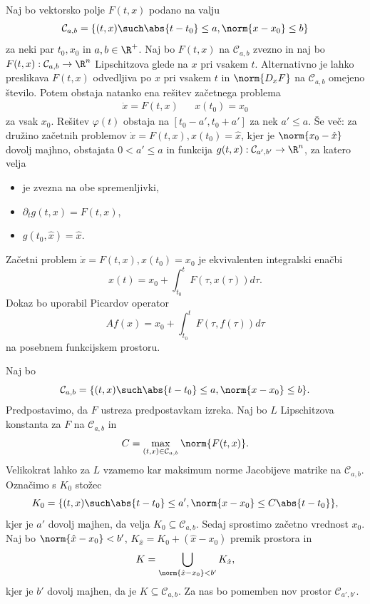 
\begin{izrek}[Eksistenčni]
  Naj bo vektorsko polje $F(t, x)$ podano na valju
  \[
	\mathcal{C}_{a, b}
	= \{(t, x) \such \abs{t-t_0} \le a, \norm{x - x_0} \le b \}
  \]
  za neki par $t_0, x_0$ in $a, b \in \R^+$.
  Naj bo $F(t, x)$ na $\mathcal{C}_{a,b}$ zvezno in naj bo $F(t,x) :
  \mathcal{C}_{a,b} \to \R^n$ Lipschitzova glede na $x$ pri vsakem $t$.
  Alternativno je lahko preslikava $F(t, x)$ odvedljiva po $x$ pri vsakem $t$ in
  $\norm{D_x F}$ na $\mathcal{C}_{a,b}$ omejeno število.
  Potem obstaja natanko ena rešitev začetnega problema
  \begin{align*}
	\dot{x} = F(t, x) && x(t_0) = x_0
  \end{align*}
  za vsak $x_0$.
  Rešitev $\varphi(t)$ obstaja na $[t_0 - a', t_0 + a']$ za nek $a' \le a$.
  Še več: za družino začetnih problemov $\dot{x} = F(t, x), x(t_0) = \hat{x}$,
  kjer je $\norm{x_0 - \hat{x}}$ dovolj majhno, obstajata $0 < a' \le a$ in
  funkcija $g(t, x) : \mathcal{C}_{a',b'} \to \R^n$, za katero velja
  \begin{itemize}
  \item je zvezna na obe spremenljivki,
  \item $\partial_t g(t, x) = F(t, x)$,
  \item $g(t_0, \hat{x}) = \hat{x}$.
  \end{itemize}
\end{izrek}


Začetni problem $\dot{x} = F(t,x), x(t_0) = x_0$ je ekvivalenten integralski
enačbi
\[
  x(t) = x_0 + \int_{t_0}^t F(\tau, x(\tau)) d\tau.
\]
Dokaz bo uporabil Picardov operator
\[
  Af(x) = x_0 + \int_{t_0}^t F(\tau, f(\tau)) d\tau
\]
na posebnem funkcijskem prostoru.

Naj bo
\[
  \mathcal{C}_{a, b}
  = \{(t, x) \such \abs{t-t_0} \le a, \norm{x - x_0} \le b \}.
\]
Predpostavimo, da $F$ ustreza predpostavkam izreka.
Naj bo $L$ Lipschitzova konstanta za $F$ na $\mathcal{C}_{a,b}$ in
\[
  C = \max_{(t, x) \in \mathcal{C}_{a,b}} \norm{F(t,x)}.
\]
Velikokrat lahko za $L$ vzamemo kar maksimum norme Jacobijeve matrike na
$\mathcal{C}_{a,b}$.
Označimo s $K_0$ stožec
\[
  K_0
  = \{(t, x) \such \abs{t-t_0} \le a', \norm{x - x_0} \le C \abs{t-t_0} \},
\]
kjer je $a'$ dovolj majhen, da velja $K_0 \subseteq \mathcal{C}_{a,b}$.
Sedaj sprostimo začetno vrednost $x_0$.
Naj bo $\norm{\hat{x} - x_0} < b'$, $K_{\hat{x}} = K_0 + (\hat{x}-x_0)$ premik
prostora in
\[
  K = \bigcup_{\norm{\hat{x} - x_0} < b'} K_{\hat{x}},
\]
kjer je $b'$ dovolj majhen, da je $K \subseteq \mathcal{C}_{a,b}$.
Za nas bo pomemben nov prostor $\mathcal{C}_{a', b'}$.

